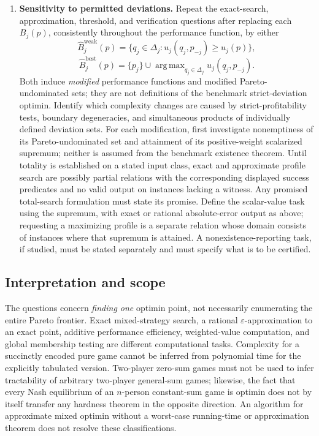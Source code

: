 \documentclass[11pt,a4paper]{article}
\DeclareMathOperator*{\argmax}{arg\,max}
\begin{document}
\begin{enumerate}[label=\textbf{(\Alph*)},leftmargin=2.7em]
\item \textbf{Sensitivity to permitted deviations.}
Repeat the exact-search, approximation, threshold, and verification questions after replacing each $B_j(p)$, consistently throughout the performance function, by either
\[
\widehat B_j^{\mathrm{weak}}(p)
=\{q_j\in\Delta_j:u_j(q_j,p_{-j})\ge u_j(p)\},
\]
\[
\widehat B_j^{\mathrm{best}}(p)
=\{p_j\}\cup\argmax_{q_j\in\Delta_j}u_j(q_j,p_{-j}).
\]
Both induce \emph{modified} performance functions and modified Pareto-undominated sets; they are not definitions of the benchmark strict-deviation optimin. Identify which complexity changes are caused by strict-profitability tests, boundary degeneracies, and simultaneous products of individually defined deviation sets. For each modification, first investigate nonemptiness of its Pareto-undominated set and attainment of its positive-weight scalarized supremum; neither is assumed from the benchmark existence theorem. Until totality is established on a stated input class, exact and approximate profile search are possibly partial relations with the corresponding displayed success predicates and no valid output on instances lacking a witness. Any promised total-search formulation must state its promise. Define the scalar-value task using the supremum, with exact or rational absolute-error output as above; requesting a maximizing profile is a separate relation whose domain consists of instances where that supremum is attained. A nonexistence-reporting task, if studied, must be stated separately and must specify what is to be certified.
\end{enumerate}

\subsection*{Interpretation and scope}

The questions concern \emph{finding one} optimin point, not necessarily enumerating the entire Pareto frontier. Exact mixed-strategy search, a rational $\varepsilon$-approximation to an exact point, additive performance efficiency, weighted-value computation, and global membership testing are different computational tasks. Complexity for a succinctly encoded pure game cannot be inferred from polynomial time for the explicitly tabulated version. Two-player zero-sum games must not be used to infer tractability of arbitrary two-player general-sum games; likewise, the fact that every Nash equilibrium of an $n$-person constant-sum game is optimin does not by itself transfer any hardness theorem in the opposite direction. An algorithm for approximate mixed optimin without a worst-case running-time or approximation theorem does not resolve these classifications.
\end{document}

